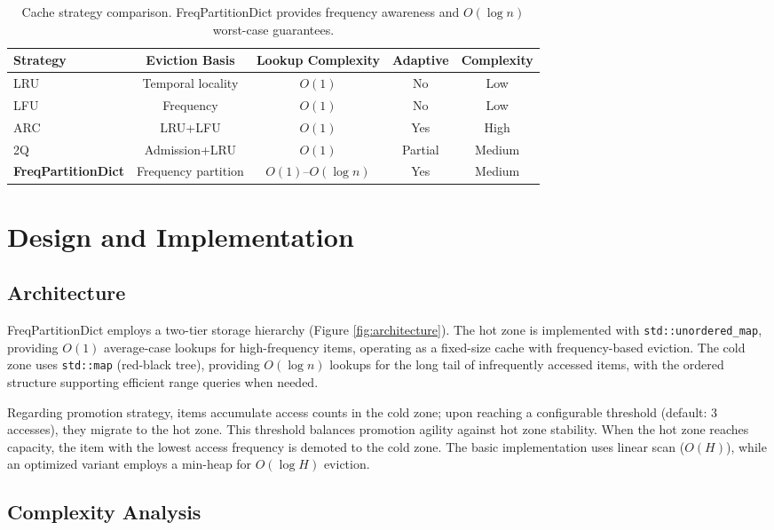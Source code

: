 \documentclass[11pt,a4paper]{article}
\begin{document}
\begin{table}[H]
\centering
\caption{Cache strategy comparison. FreqPartitionDict provides frequency awareness and $O(\log n)$ worst-case guarantees.}
\label{tab:comparison}
\begin{tabular}{lcccc}
\toprule
\textbf{Strategy} & \textbf{Eviction Basis} & \textbf{Lookup Complexity} & \textbf{Adaptive} & \textbf{Complexity} \\
\midrule
LRU & Temporal locality & $O(1)$ & No & Low \\
LFU & Frequency & $O(1)$ & No & Low \\
ARC & LRU+LFU & $O(1)$ & Yes & High \\
2Q & Admission+LRU & $O(1)$ & Partial & Medium \\
\textbf{FreqPartitionDict} & Frequency partition & $O(1)$--$O(\log n)$ & Yes & Medium \\
\bottomrule
\end{tabular}
\end{table}

\section{Design and Implementation}

\subsection{Architecture}

FreqPartitionDict employs a two-tier storage hierarchy (Figure \ref{fig:architecture}). The hot zone is implemented with \texttt{std::unordered\_map}, providing $O(1)$ average-case lookups for high-frequency items, operating as a fixed-size cache with frequency-based eviction. The cold zone uses \texttt{std::map} (red-black tree), providing $O(\log n)$ lookups for the long tail of infrequently accessed items, with the ordered structure supporting efficient range queries when needed.

Regarding promotion strategy, items accumulate access counts in the cold zone; upon reaching a configurable threshold (default: 3 accesses), they migrate to the hot zone. This threshold balances promotion agility against hot zone stability. When the hot zone reaches capacity, the item with the lowest access frequency is demoted to the cold zone. The basic implementation uses linear scan ($O(H)$), while an optimized variant employs a min-heap for $O(\log H)$ eviction.

\subsection{Complexity Analysis}
\end{document}
